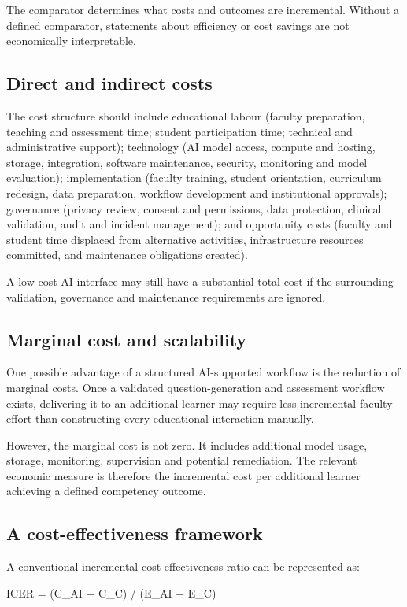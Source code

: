 \documentclass[11pt,a4paper]{article}
\begin{document}
The comparator determines what costs and outcomes are incremental. Without a defined comparator, statements about efficiency or cost savings are not economically interpretable.

\subsection{Direct and indirect costs}
The cost structure should include educational labour (faculty preparation, teaching and assessment time; student participation time; technical and administrative support); technology (AI model access, compute and hosting, storage, integration, software maintenance, security, monitoring and model evaluation); implementation (faculty training, student orientation, curriculum redesign, data preparation, workflow development and institutional approvals); governance (privacy review, consent and permissions, data protection, clinical validation, audit and incident management); and opportunity costs (faculty and student time displaced from alternative activities, infrastructure resources committed, and maintenance obligations created).

A low-cost AI interface may still have a substantial total cost if the surrounding validation, governance and maintenance requirements are ignored.

\subsection{Marginal cost and scalability}
One possible advantage of a structured AI-supported workflow is the reduction of marginal costs. Once a validated question-generation and assessment workflow exists, delivering it to an additional learner may require less incremental faculty effort than constructing every educational interaction manually.

However, the marginal cost is not zero. It includes additional model usage, storage, monitoring, supervision and potential remediation. The relevant economic measure is therefore the incremental cost per additional learner achieving a defined competency outcome.

\subsection{A cost-effectiveness framework}
A conventional incremental cost-effectiveness ratio can be represented as:

ICER = (C\_AI − C\_C) / (E\_AI − E\_C)
\end{document}
